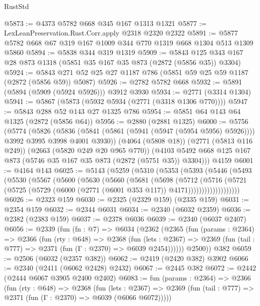\begin{lexlean}{RustStd}
\begin{coremodule}
@5873 := @4373 @5782 @668 @345 @167 @1313 @1321
@5877 := LexLeanPreservation.Rust.Corr.apply @2318 @2320 @2322
@5891 := @5877 @5782 @668 @67 @319 @167 @1009 @344 @770 @1319 @668 @1304 @513 @1309 @5860
@5894 := @5838 @344 @319 @1319
@5909 := @5843 @125 @343 @167 @28 @873 @1318 (@5851 @35 @167 @35 @873 (@2872 (@5856 @35)) @3304)
@5924 := @5843 @271 @52 @25 @27 @1187 @786 (@5851 @59 @25 @59 @1187 (@2872 (@5856 @59)) @5087)
@5926 := @2782 @5782 @668
@5932 := @5891 (@5894 (@5909 (@5924 @5926))) @3912 @3930
@5934 := @2771 (@3314 @1304)
@5941 := @5867 (@5873 (@5932 @5934 (@2771 (@3318 @1306 @770))))
@5947 := @5843 @288 @52 @143 @27 @1325 @786
@5954 := @5851 @64 @143 @64 @1325 (@2872 (@5856 @64))
@5956 := @2880 (@2881 @1325)
@6000 := @5756
    (@5774
      (@5826
        (@5836 (@5841 (@5861 (@5941 (@5947 (@5954 @5956) @5926)))) @3992 @3995 @3998 @4001 @3930))
      (@4064 (@5808 @18))
      (@2771 (@5813 @116 @249))
      (@2663 (@5820 @249 @20 @965 @770))
      (@4103 @5492 @668 @125 @167 @873 (@5746 @35 @167 @35 @873 (@2872 (@5751 @35)) @3304)))
    @4159
@6001 := @4164 @143
@6025 := @5143
    (@5259
      (@5310
        (@5353
          (@5393
            (@5446
              (@5493
                (@5530
                  (@5567
                    (@5600
                      (@5630
                        (@5660
                          (@5681
                            (@5698
                              (@5712
                                (@5716
                                  (@5721
                                    (@5725
                                      (@5729
                                        (@6000 (@2771 (@6001 @353 @117)) @4171)))))))))))))))))))
@6026 := @2323 @159
@6030 := @2325 (@2329 @159) (@2335 @159)
@6031 := @2354 @159
@6032 := @2344 @6031
@6034 := @2340 (@6032 @2359)
@6036 := @2382 (@2383 @159)
@6037 := @2378 @6036
@6039 := @2340 (@6037 @2407)
@6056 := @2339
    (fun (fn : @7) =>
    @6034
      (@2362
        (@2365
          (fun (params : @2364) =>
          @2366
            (fun (rty : @648) =>
            @2368
              (fun (lets : @2367) =>
              @2369 (fun (tail : @777) => @2371 (fun (Γ : @2370) => @6039 @2454))))))
        @2500))
    @382
@6059 := @2506 (@6032 (@2357 @382))
@6062 := @2419 (@2420 @382) @3902
@6066 := @2340 (@2411 (@6062 @2428) @2432)
@6067 := @2445 @382
@6072 := @2442 (@2444 @6067 @3905 @2400 @2402)
@6083 := fun (params : @2364) =>
  @2366
    (fun (rty : @648) =>
    @2368
      (fun (lets : @2367) =>
      @2369 (fun (tail : @777) => @2371 (fun (Γ : @2370) => @6039 (@6066 @6072)))))

\end{coremodule}
\end{lexlean}

